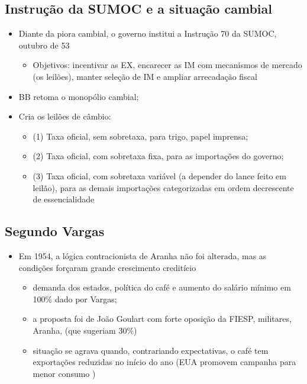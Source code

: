 \documentclass[a4paper,12pt]{article}[abntex2]
\begin{document}
\subsection{Instrução da SUMOC e a situação cambial}
\begin{itemize}
    \item Diante da piora cambial, o governo institui a Instrução 70 da SUMOC, outubro de 53
    \begin{itemize}
        \item Objetivos: incentivar as EX, encarecer as IM com mecanismos de mercado (os leilões), manter seleção de IM e ampliar arrecadação fiscal
    \end{itemize}
    \item  BB retoma o monopólio cambial;
    \item Cria os leilões de câmbio:
    \begin{itemize}
        \item  (1) Taxa oficial, sem sobretaxa, para trigo, papel imprensa;
        \item (2) Taxa oficial, com sobretaxa fixa, para as importações do governo;
        \item (3) Taxa oficial, com sobretaxa variável (a depender do lance feito em leilão), para as demais importações categorizadas em ordem decrescente de essencialidade
    \end{itemize}
\end{itemize}

\subsection{Segundo Vargas}
\begin{itemize}
    \item  Em 1954, a lógica contracionista de Aranha não foi alterada, mas as condições forçaram grande crescimento creditício
    \begin{itemize}
        \item demanda dos estados, política do café e aumento do salário mínimo em 100\% dado por Vargas;
    \end{itemize}
    \begin{itemize}
        \item a proposta foi de João Goulart com forte oposição da FIESP, militares, Aranha, (que sugeriam 30\%)
    \end{itemize}
    \begin{itemize}
        \item situação se agrava quando, contrariando expectativas, o café tem exportações reduzidas no início do ano (EUA promovem campanha para menor consumo )

    \end{itemize}
\end{itemize}
\end{document}
